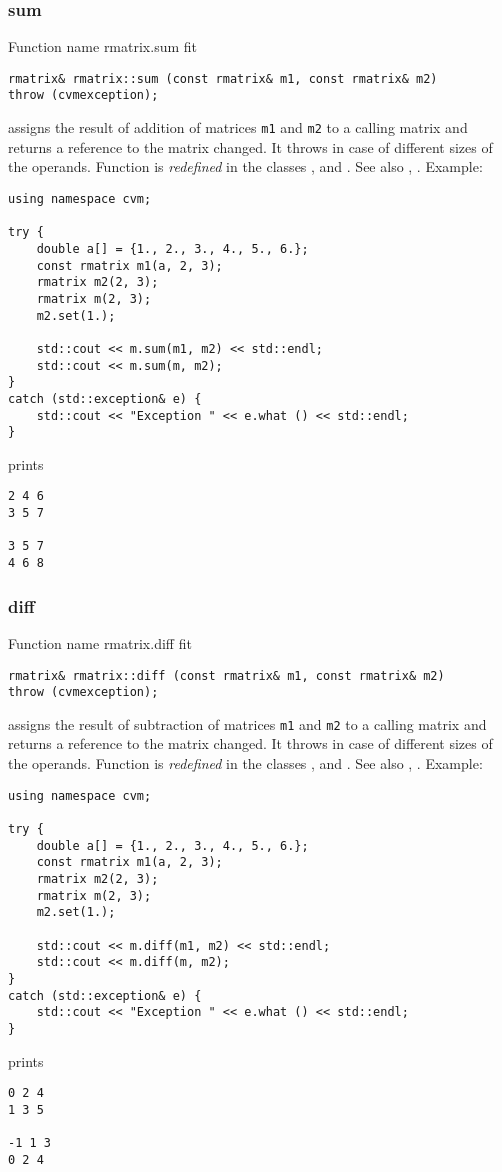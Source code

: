 \subsubsection{sum}
Function%
\pdfdest name {rmatrix.sum} fit
\begin{verbatim}
rmatrix& rmatrix::sum (const rmatrix& m1, const rmatrix& m2)
throw (cvmexception);
\end{verbatim}
assigns the result of addition of
matrices \verb"m1" and \verb"m2"  to a calling matrix
and returns a reference to
the matrix changed.
It throws  
in case of different sizes of the operands.
Function is \emph{redefined} in the classes
, 
and .
See also ,
.
Example:
\begin{Verbatim}
using namespace cvm;

try {
    double a[] = {1., 2., 3., 4., 5., 6.};
    const rmatrix m1(a, 2, 3);
    rmatrix m2(2, 3);
    rmatrix m(2, 3);
    m2.set(1.);

    std::cout << m.sum(m1, m2) << std::endl;
    std::cout << m.sum(m, m2);
}
catch (std::exception& e) {
    std::cout << "Exception " << e.what () << std::endl;
}
\end{Verbatim}
prints
\begin{Verbatim}
2 4 6
3 5 7

3 5 7
4 6 8
\end{Verbatim}
\newpage



\subsubsection{diff}
Function%
\pdfdest name {rmatrix.diff} fit
\begin{verbatim}
rmatrix& rmatrix::diff (const rmatrix& m1, const rmatrix& m2)
throw (cvmexception);
\end{verbatim}
assigns the result of subtraction of
matrices \verb"m1" and \verb"m2" to a calling matrix
and returns a reference to
the matrix changed.
It throws  
in case of different sizes of the operands.
Function is \emph{redefined} in the classes
, 
and .
See also ,
.
Example:
\begin{Verbatim}
using namespace cvm;

try {
    double a[] = {1., 2., 3., 4., 5., 6.};
    const rmatrix m1(a, 2, 3);
    rmatrix m2(2, 3);
    rmatrix m(2, 3);
    m2.set(1.);

    std::cout << m.diff(m1, m2) << std::endl;
    std::cout << m.diff(m, m2);
}
catch (std::exception& e) {
    std::cout << "Exception " << e.what () << std::endl;
}
\end{Verbatim}
prints
\begin{Verbatim}
0 2 4
1 3 5

-1 1 3
0 2 4
\end{Verbatim}
\newpage



